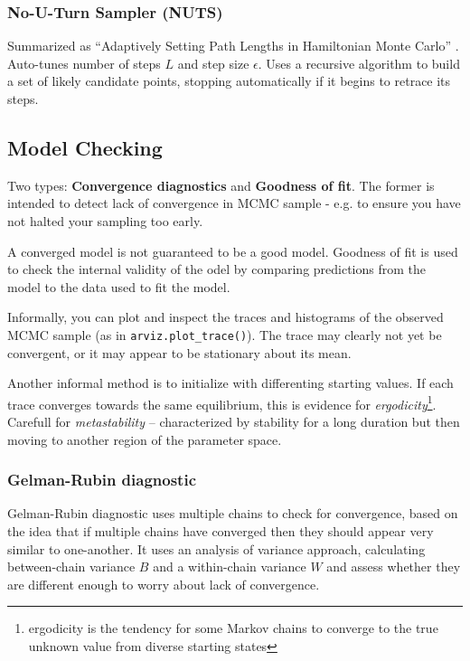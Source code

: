 \documentclass[12pt]{article}
\begin{document}
\subsubsection{No-U-Turn Sampler (NUTS)}

Summarized as ``Adaptively Setting Path Lengths in Hamiltonian Monte Carlo''
\cite{DBLP:journals/jmlr/HoffmanG14}. Auto-tunes number of steps $L$ and step
size $\epsilon$. Uses a recursive algorithm to build a set
of likely candidate points, stopping automatically if it begins to retrace its
steps.

\subsection{Model Checking}

Two types: {\bf Convergence diagnostics} and {\bf Goodness of fit}. The former
is intended to detect lack of convergence in MCMC sample - e.g. to ensure you
have not halted your sampling too early.

A converged model is not guaranteed to be a good model. Goodness of fit is used
to check the internal validity of the odel by comparing predictions from the
model to the data used to fit the model.

Informally, you can plot and inspect the traces and histograms of the observed
MCMC sample (as in {\tt arviz.plot\_trace()}). The trace may clearly not yet be
convergent, or it may appear to be stationary about its mean.

Another informal method is to initialize with differenting starting values. If
each trace converges towards the same equilibrium, this is evidence for {\sl
  ergodicity}\footnote{ergodicity is the tendency for some Markov chains to converge to the true
unknown value from diverse starting states}. Carefull for {\sl metastability} --
characterized by stability for a long duration but then moving to another region
of the parameter space.

\subsubsection{Gelman-Rubin diagnostic}

Gelman-Rubin diagnostic uses multiple chains to check for convergence, based on
the idea that if multiple chains have converged then they should appear very
similar to one-another. It uses an analysis of variance approach, calculating
between-chain variance $B$ and a within-chain variance $W$ and assess whether
they are different enough to worry about lack of convergence.
\end{document}
